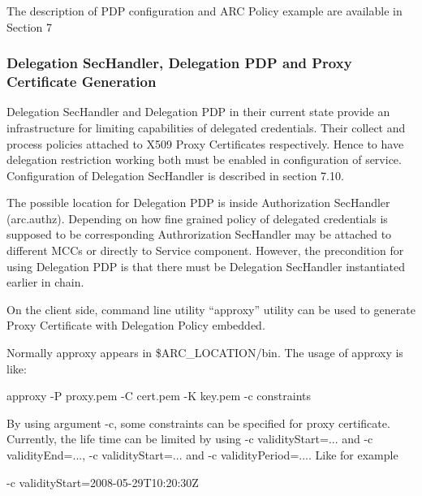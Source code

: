 \documentclass{article}
\begin{document}
{\upshape\color{black}
The description of PDP configuration and ARC Policy example are
available in Section 7}

\subsubsection[Delegation SecHandler, Delegation PDP and Proxy
Certificate Generation]{Delegation SecHandler, Delegation PDP and Proxy
Certificate Generation}
{\upshape\color{black}
Delegation SecHandler and Delegation PDP in their current state provide
an infrastructure for limiting capabilities of delegated credentials.
Their collect and process policies attached to X509 Proxy Certificates
respectively. Hence to have delegation restriction working both must be
enabled in configuration of service. Configuration of Delegation
SecHandler is described in section 7.10. }

{\color{black}
The possible location for Delegation PDP is inside Authorization
SecHandler (arc.authz). Depending on how fine grained policy of
delegated credentials is supposed to be corresponding Authrorization
SecHandler may be attached to different MCCs or directly to Service
component. However, the precondition for using Delegation PDP is that
there must be Delegation SecHandler instantiated earlier in chain.}

{\color{black}
On the client side, command line utility
{\textquotedblleft}approxy{\textquotedblright} utility can be used to
generate Proxy Certificate with Delegation Policy embedded.}

{\color{black}
Normally approxy appears in \$ARC\_LOCATION/bin. The usage of approxy is
like:}

{\color{black}
approxy -P proxy.pem -C cert.pem -K key.pem -c constraints}

{\color{black}
By using argument {\textquotedbl}-c{\textquotedbl}, some constraints can
be specified for proxy certificate. Currently, the life time can be
limited by using {\textquotedbl}-c validityStart=...{\textquotedbl} and
{\textquotedbl}-c validityEnd=...{\textquotedbl}, {\textquotedbl}-c
validityStart=...{\textquotedbl} and {\textquotedbl}-c
validityPeriod=...{\textquotedbl}. Like for example }

{\color{black}
{}-c validityStart=2008-05-29T10:20:30Z}
\end{document}
